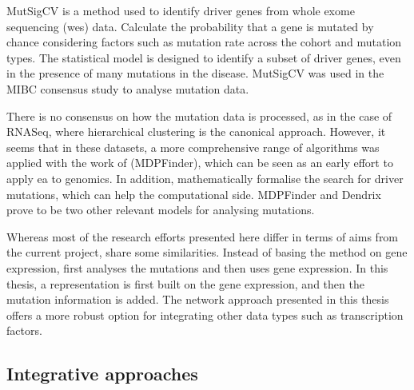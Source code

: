 MutSigCV \citep{Lawrence2013-pl} is a method used to identify driver genes from whole exome sequencing (\acrshort{wes}) data. Calculate the probability that a gene is mutated by chance considering factors such as mutation rate across the cohort and mutation types. The statistical model is designed to identify a subset of driver genes, even in the presence of many mutations in the disease. MutSigCV was used in the MIBC consensus study \citep{Kamoun2020-tj} to analyse mutation data.

There is no consensus on how the mutation data is processed, as in the case of RNASeq, where hierarchical clustering is the canonical approach. However, it seems that in these datasets, a more comprehensive range of algorithms was applied with the work of \citet{Zhao2012-wj} (MDPFinder), which can be seen as an early effort to apply \acrshort{ea} to genomics. In addition, \citet{Vandin2012-cf} mathematically formalise the search for driver mutations, which can help the computational side. MDPFinder and Dendrix prove to be two other relevant models for analysing mutations. 

Whereas most of the research efforts presented here differ in terms of aims from the current project, \citet{Zhao2012-wj} share some similarities. Instead of basing the method on gene expression, \citet{Zhao2012-wj} first analyses the mutations and then uses gene expression. In this thesis, a representation is first built on the gene expression, and then the mutation information is added. The network approach presented in this thesis offers a more robust option for integrating other data types such as transcription factors.


\subsection{Integrative approaches} \label{s:lit:multi-view}

\vspace{3mm}
\vspace{3mm}

